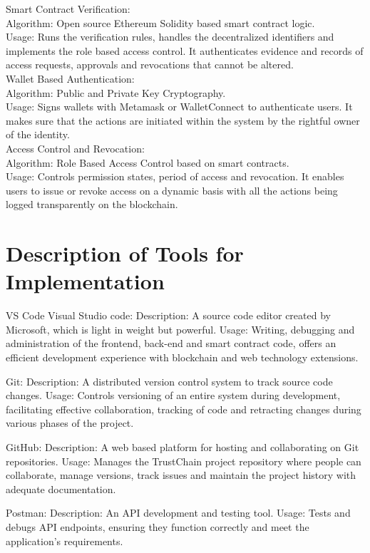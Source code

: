 Smart Contract Verification:\\
Algorithm: Open source Ethereum Solidity based smart contract logic.\\
Usage: Runs the verification rules, handles the decentralized identifiers and implements the role based access control. It authenticates evidence and records of access requests, approvals and revocations that cannot be altered.\\

Wallet Based Authentication:\\
Algorithm: Public and Private Key Cryptography.\\
Usage: Signs wallets with Metamask or WalletConnect to authenticate users. It makes sure that the actions are initiated within the system by the rightful owner of the identity.\\

Access Control and Revocation:\\
Algorithm: Role Based Access Control based on smart contracts.\\
Usage: Controls permission states, period of access and revocation. It enables users to issue or revoke access on a dynamic basis with all the actions being logged transparently on the blockchain.\\

\section{Description of Tools for Implementation}

VS Code Visual Studio code:
Description: A source code editor created by Microsoft, which is light in weight but powerful.
Usage: Writing, debugging and administration of the frontend, back-end and smart contract code, offers an efficient development experience with blockchain and web technology extensions.

Git:
Description: A distributed version control system to track source code changes.
Usage: Controls versioning of an entire system during development, facilitating effective collaboration, tracking of code and retracting changes during various phases of the project.

GitHub:
Description: A web based platform for hosting and collaborating on Git repositories.
Usage: Manages the TrustChain project repository where people can collaborate, manage versions, track issues and maintain the project history with adequate documentation.

Postman:
Description: An API development and testing tool.
Usage: Tests and debugs API endpoints, ensuring they function correctly and meet the application's requirements.

